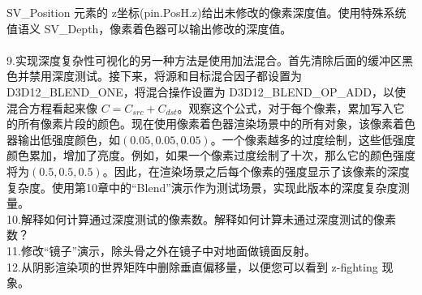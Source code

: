 \begin{flushleft}
SV\_Position 元素的 z坐标(pin.PosH.z)给出未修改的像素深度值。使用特殊系统值语义 SV\_Depth，像素着色器可以输出修改的深度值。\\
~\\
9.实现深度复杂性可视化的另一种方法是使用加法混合。首先清除后面的缓冲区黑色并禁用深度测试。接下来，将源和目标混合因子都设置为 D3D12\_BLEND\_ONE，将混合操作设置为 D3D12\_BLEND\_OP\_ADD，以使混合方程看起来像 $C=C_{src}+C_{dst}$。观察这个公式，对于每个像素，累加写入它的所有像素片段的颜色。现在使用像素着色器渲染场景中的所有对象，该像素着色器输出低强度颜色，如$(0.05,0.05,0.05)$。一个像素越多的过度绘制，这些低强度颜色累加，增加了亮度。例如，如果一个像素过度绘制了十次，那么它的颜色强度将为$(0.5,0.5,0.5)$。因此，在渲染场景之后每个像素的强度显示了该像素的深度复杂度。使用第10章中的“Blend”演示作为测试场景，实现此版本的深度复杂度测量。\\

10.解释如何计算通过深度测试的像素数。解释如何计算未通过深度测试的像素数？\\
11.修改“镜子”演示，除头骨之外在镜子中对地面做镜面反射。\\
12.从阴影渲染项的世界矩阵中删除垂直偏移量，以便您可以看到 z-fighting 现象。\\
\end{flushleft}
